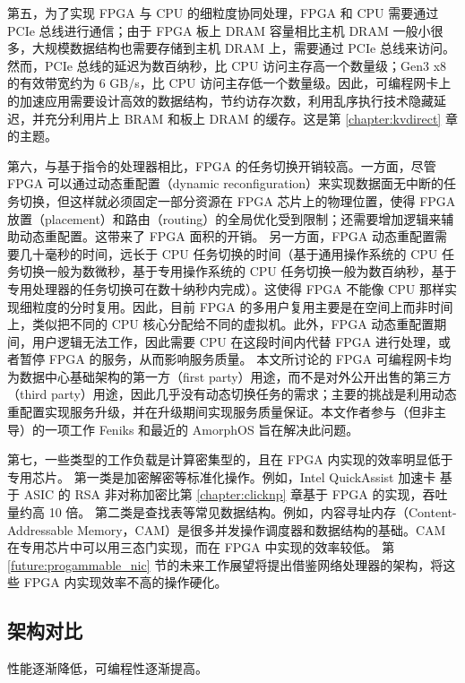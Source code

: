 第五，为了实现 FPGA 与 CPU 的细粒度协同处理，FPGA 和 CPU 需要通过 PCIe 总线进行通信；由于 FPGA 板上 DRAM 容量相比主机 DRAM 一般小很多，大规模数据结构也需要存储到主机 DRAM 上，需要通过 PCIe 总线来访问。然而，PCIe 总线的延迟为数百纳秒，比 CPU 访问主存高一个数量级；Gen3 x8 的有效带宽约为 6 GB/s，比 CPU 访问主存低一个数量级。因此，可编程网卡上的加速应用需要设计高效的数据结构，节约访存次数，利用乱序执行技术隐藏延迟，并充分利用片上 BRAM 和板上 DRAM 的缓存。这是第 \ref{chapter:kvdirect} 章的主题。

第六，与基于指令的处理器相比，FPGA 的任务切换开销较高。一方面，尽管 FPGA 可以通过动态重配置（dynamic reconfiguration）来实现数据面无中断的任务切换，但这样就必须固定一部分资源在 FPGA 芯片上的物理位置，使得 FPGA 放置（placement）和路由（routing）的全局优化受到限制；还需要增加逻辑来辅助动态重配置。这带来了 FPGA 面积的开销。
另一方面，FPGA 动态重配置需要几十毫秒的时间，远长于 CPU 任务切换的时间（基于通用操作系统的 CPU 任务切换一般为数微秒，基于专用操作系统的 CPU 任务切换一般为数百纳秒，基于专用处理器的任务切换可在数十纳秒内完成）。这使得 FPGA 不能像 CPU 那样实现细粒度的分时复用。因此，目前 FPGA 的多用户复用主要是在空间上而非时间上，类似把不同的 CPU 核心分配给不同的虚拟机。此外，FPGA 动态重配置期间，用户逻辑无法工作，因此需要 CPU 在这段时间内代替 FPGA 进行处理，或者暂停 FPGA 的服务，从而影响服务质量。
本文所讨论的 FPGA 可编程网卡均为数据中心基础架构的第一方（first party）用途，而不是对外公开出售的第三方（third party）用途，因此几乎没有动态切换任务的需求；主要的挑战是利用动态重配置实现服务升级，并在升级期间实现服务质量保证。本文作者参与（但非主导）的一项工作 Feniks \cite{zhang2017feniks} 和最近的 AmorphOS \cite{khawaja2018sharing} 旨在解决此问题。

第七，一些类型的工作负载是计算密集型的，且在 FPGA 内实现的效率明显低于专用芯片。
第一类是加密解密等标准化操作。例如，Intel QuickAssist 加速卡 \cite{intel-qat} 基于 ASIC 的 RSA 非对称加密比第 \ref{chapter:clicknp} 章基于 FPGA 的实现，吞吐量约高 10 倍。
第二类是查找表等常见数据结构。例如，内容寻址内存（Content-Addressable Memory，CAM）是很多并发操作调度器和数据结构的基础。CAM 在专用芯片中可以用三态门实现，而在 FPGA 中实现的效率较低。
第 \ref{future:progammable_nic} 节的未来工作展望将提出借鉴网络处理器的架构，将这些 FPGA 内实现效率不高的操作硬化。

\iffalse
\subsection{架构对比}
\label{smartnic-comparison}

性能逐渐降低，可编程性逐渐提高。

